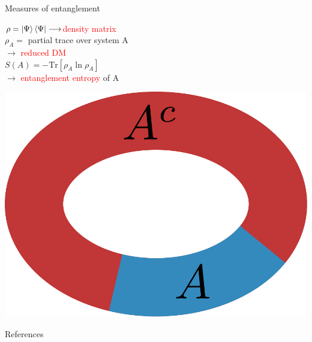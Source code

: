 \documentclass[11pt,aspectratio=169]{beamer}
\newcommand{\focus}[1]{\textcolor{red}{#1}}
\begin{document}
\begin{frame}[allowframebreaks]{Measures of entanglement}
	\begin{minipage}{0.6\textwidth}
		\(\rho = \ket{\Psi}\bra{\Psi}\longrightarrow\)\focus{density matrix}\\[10pt]
	\(\rho_A = \) partial trace over system A\\
	\(\longrightarrow\) \focus{reduced DM}\\[10pt]
	\(S(A) = -\text{Tr}\left[\rho_A \ln \rho_A\right] \)\\
	\(\longrightarrow\) \focus{entanglement entropy} of A\\[10pt]
	\end{minipage}
	\hspace*{\fill}
	\begin{minipage}{0.38\textwidth}
\includegraphics[width=\textwidth]{figures/subsystem-A.pdf}
\end{minipage}
\end{frame}


\begin{frame}[allowframebreaks]{References}
\printbibliography
\end{frame}
\end{document}

